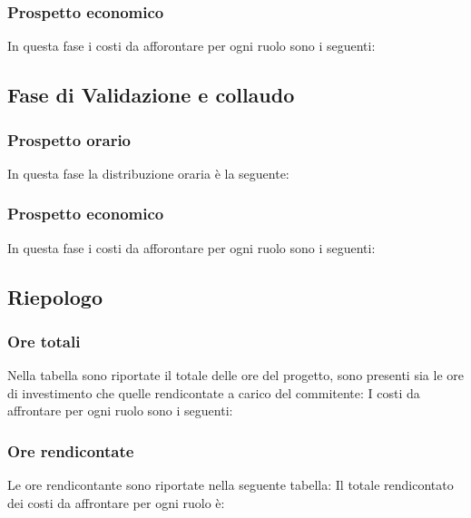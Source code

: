     \subsubsection{Prospetto economico}
    In questa fase i costi da afforontare per ogni ruolo sono i seguenti:
\subsection{Fase di Validazione e collaudo}
    \subsubsection{Prospetto orario}
    In questa fase la distribuzione oraria è la seguente:
    \subsubsection{Prospetto economico}
    In questa fase i costi da afforontare per ogni ruolo sono i seguenti:
\subsection{Riepologo}
    \subsubsection{Ore totali}
        Nella tabella sono riportate il totale delle ore del progetto, sono presenti sia le ore di investimento che quelle rendicontate a carico del commitente:
        I costi da affrontare per ogni ruolo sono i seguenti:
    \subsubsection{Ore rendicontate}
        Le ore rendicontante sono riportate nella seguente tabella:
        Il totale rendicontato dei costi da affrontare per ogni ruolo è:
